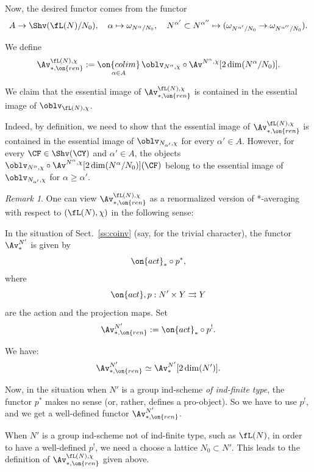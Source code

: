\documentclass[9pt]{amsart}
\theoremstyle{definition}
\theoremstyle{remark}
\newtheorem{rem}[subsubsection]{Remark}
\newcommand{\secref}[1]{Sect.~\ref{#1}}
\numberwithin{equation}{section}
\begin{document}
Now, the desired functor comes from the functor
$$A\to \Shv(\fL(N)/N_0), \quad \alpha\mapsto \omega_{N^\alpha/N_0}, \quad 
N^{\alpha'}\subset N^{\alpha''} \mapsto (\omega_{N^{\alpha'}/N_0}\to \omega_{N^{\alpha''}/N_0}).$$

\sssec{} \label{sss:ren inv}

We define 
$$\Av^{\fL(N),\chi}_{*,\on{ren}}:=\underset{\alpha\in A}{\on{colim}}\, 
\oblv_{N^\alpha,\chi}\circ \Av^{N^\alpha,\chi}[2\dim(N^\alpha/N_0)].$$

\medskip

We claim that the essential image of $\Av^{\fL(N),\chi}_{*,\on{ren}}$ is contained in the essential image of 
$\oblv_{\fL(N),\chi}$.

\medskip

Indeed, by definition, we need to show that the essential image of $\Av^{\fL(N),\chi}_{*,\on{ren}}$ is contained in the essential image of 
$\oblv_{N_{\alpha'},\chi}$ for every $\alpha'\in A$. However, for every $\CF\in \Shv(\CY)$ and $\alpha'\in A$, 
the objects $\oblv_{N^\alpha,\chi}\circ \Av^{N^\alpha,\chi}[2\dim(N^\alpha/N_0)](\CF)$
belong to the essential image of $\oblv_{N_{\alpha'},\chi}$ for $\alpha\geq \alpha'$. 

\begin{rem}  \label{r:ren av}
One can view $\Av^{\fL(N),\chi}_{*,\on{ren}}$ as a renormalized version of *-averaging with respect to $(\fL(N),\chi)$ in the
following sense:

\medskip  

In the situation of \secref{ss:coinv} (say, for the trivial character), the functor $\Av^{N'}_*$ is given by 
$$\on{act}_*\circ p^*,$$
where
$$\on{act},p:N'\times Y\rightrightarrows Y$$
are the action and the projection maps. Set
$$\Av^{N'}_{*,\on{ren}}:=\on{act}_*\circ p^!.$$

We have:
$$\Av^{N'}_{*,\on{ren}}\simeq \Av^{N'}_*[2\dim(N')].$$

Now, in the situation when $N'$ is a group ind-scheme \emph{of ind-finite type}, the functor $p^*$ makes no sense
(or, rather, defines a pro-object). So we have to use $p^!$, and we get a well-defined functor 
$\Av^{N'}_{*,\on{ren}}$. 

\medskip

When $N'$ is a group ind-scheme not of ind-finite type, such as $\fL(N)$, in order to have
a well-defined $p^!$, we need a choose a lattice $N_0\subset N'$. This leads to the definition of 
$\Av^{\fL(N),\chi}_{*,\on{ren}}$ given above.

\end{rem}
\end{document}

